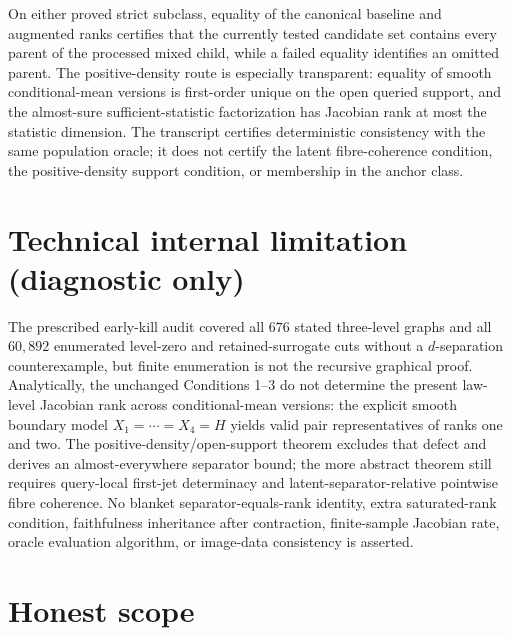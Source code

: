 \documentclass{article}
\begin{document}
On either proved strict subclass, equality of the canonical baseline and augmented ranks certifies that the currently tested candidate set contains every parent of the processed mixed child, while a failed equality identifies an omitted parent.  The positive-density route is especially transparent: equality of smooth conditional-mean versions is first-order unique on the open queried support, and the almost-sure sufficient-statistic factorization has Jacobian rank at most the statistic dimension.  The transcript certifies deterministic consistency with the same population oracle; it does not certify the latent fibre-coherence condition, the positive-density support condition, or membership in the anchor class.

\section*{Technical internal limitation (diagnostic only)}

The prescribed early-kill audit covered all \(676\) stated three-level graphs and all \(60{,}892\) enumerated level-zero and retained-surrogate cuts without a \(d\)-separation counterexample, but finite enumeration is not the recursive graphical proof.  Analytically, the unchanged Conditions 1--3 do not determine the present law-level Jacobian rank across conditional-mean versions: the explicit smooth boundary model \(X_1=\cdots=X_4=H\) yields valid pair representatives of ranks one and two.  The positive-density/open-support theorem excludes that defect and derives an almost-everywhere separator bound; the more abstract theorem still requires query-local first-jet determinacy and latent-separator-relative pointwise fibre coherence.  No blanket separator-equals-rank identity, extra saturated-rank condition, faithfulness inheritance after contraction, finite-sample Jacobian rate, oracle evaluation algorithm, or image-data consistency is asserted.

\section{Honest scope}
\end{document}
